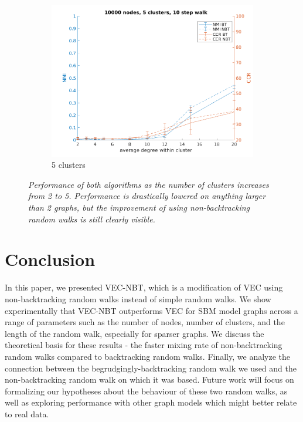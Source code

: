 \documentclass{article} %
\begin{document}
\begin{figure}[H]
\begin{subfigure}{0.33\textwidth}
        \includegraphics[width=\linewidth]{fig4/N10000K5len10}
        \caption{5 clusters}
        \label{fig:subim43}
    \end{subfigure}
    \caption{\emph{Performance of both algorithms as the number of clusters increases from 2 to 5. Performance is drastically lowered on anything larger than 2 graphs, but the improvement of using non-backtracking random walks is still clearly visible.}}
    \label{fig:image4}
\end{figure}

\section{Conclusion}
In this paper, we presented VEC-NBT, which is a modification of VEC \cite{NodeEmbed} using non-backtracking random walks instead of simple random walks. We show experimentally that VEC-NBT outperforms VEC for SBM model graphs across a range of parameters such as the number of nodes, number of clusters, and the length of the random walk, especially for sparser graphs. We discuss the theoretical basis for these results - the faster mixing rate of non-backtracking random walks compared to backtracking random walks. Finally, we analyze the connection between the begrudgingly-backtracking random walk we used and the non-backtracking random walk on which it was based. Future work will focus on formalizing our hypotheses about the behaviour of these two random walks, as well as exploring performance with other graph models which might better relate to real data.



\end{document}

